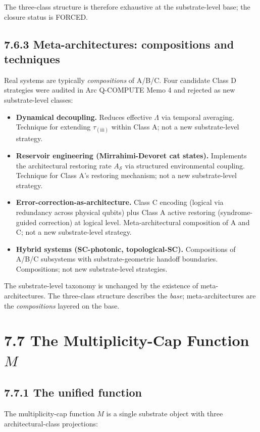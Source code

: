 \documentclass[11pt]{book}
\begin{document}
The three-class structure is therefore exhaustive at the substrate-level base; the closure status is FORCED.

\subsection{7.6.3 Meta-architectures: compositions and techniques}

Real systems are typically \textit{compositions} of A/B/C. Four candidate Class D strategies were audited in Arc Q-COMPUTE Memo 4 and rejected as new substrate-level classes:

\begin{itemize}
\item \textbf{Dynamical decoupling.} Reduces effective $\Lambda$ via temporal averaging. Technique for extending $\tau_{(\mathrm{iii})}$ within Class A; not a new substrate-level strategy.
\item \textbf{Reservoir engineering (Mirrahimi-Devoret cat states).} Implements the architectural restoring rate $A_\mathcal{S}$ via structured environmental coupling. Technique for Class A's restoring mechanism; not a new substrate-level strategy.
\item \textbf{Error-correction-as-architecture.} Class C encoding (logical via redundancy across physical qubits) plus Class A active restoring (syndrome-guided correction) at logical level. Meta-architectural composition of A and C; not a new substrate-level strategy.
\item \textbf{Hybrid systems (SC-photonic, topological-SC).} Compositions of A/B/C subsystems with substrate-geometric handoff boundaries. Compositions; not new substrate-level strategies.
\end{itemize}

The substrate-level taxonomy is unchanged by the existence of meta-architectures. The three-class structure describes the \textit{base}; meta-architectures are the \textit{compositions} layered on the base.

\section{7.7 The Multiplicity-Cap Function $M$}

\subsection{7.7.1 The unified function}

The multiplicity-cap function $M$ is a single substrate object with three architectural-class projections:
\end{document}
